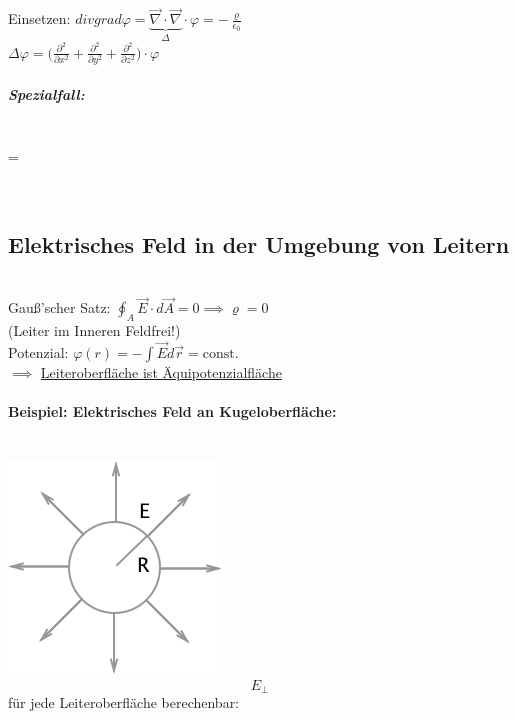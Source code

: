 \documentclass[11pt]{article}
\begin{document}
Einsetzen: $\boxed{div grad \varphi=\underbrace{\vec{\nabla}\cdot\vec{\nabla}}_{\Delta}\cdot\varphi = -\frac{\varrho}{\epsilon_0}}$\\

$ \Delta\varphi=\big(\frac{\partial^2}{\partial x^2}+\frac{\partial^2}{\partial y^2}+\frac{\partial^2}{\partial z^2}\big)\cdot\varphi $\\

\subparagraph{Spezialfall:}\\

\implies {}= \underline{\Delta{}}

\hfill\\

\subsection{Elektrisches Feld in der Umgebung von Leitern}\\

Gauß'scher Satz: $ \oint_{A}\vec{E}\cdot d\vec{A}=0 \implies \varrho=0 $\\
(Leiter im Inneren Feldfrei!)\\

Potenzial: $\varphi(r)=-\int\vec{E}d\vec{r}= \text{const.}$\\

$\implies$ \underline{Leiteroberfläche ist Äquipotenzialfläche}\\

\paragraph{Beispiel: Elektrisches Feld an Kugeloberfläche:}
\hfill\\
\includegraphics{skizzen/14/14_8B0}\\

$$ E_\perp $$ für jede Leiteroberfläche berechenbar:\\
\end{document}
